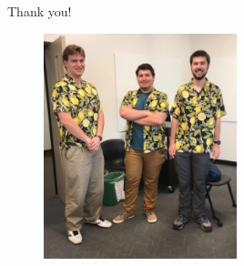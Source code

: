 \documentclass[8pt]{beamer}
\begin{document}
\begin{frame}{Thank you!}

\begin{figure}
    \centering
    \includegraphics[width = 0.5\textwidth]{group_lemon.JPG}
\end{figure}
    
\end{frame}


%
%
    
\end{document}
